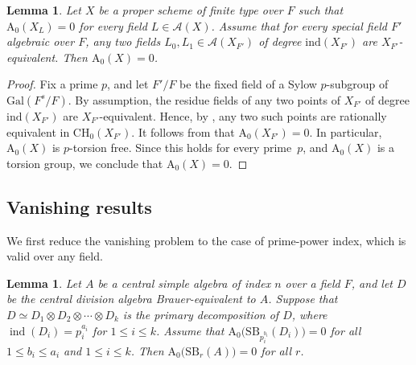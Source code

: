 \documentclass[10pt]{amsart}
\theoremstyle{plain}
\newtheorem{lemma}[thm]{Lemma}
\theoremstyle{definition}
\begin{document}
\begin{lemma}\label{main lemma for triviality} 
Let \(X\) be a proper scheme of finite type over \(F\) such that \(\mathrm{A_0}(X_L)=0\) for every field \(L \in \mathcal{A}(X)\). Assume that for every special field \(F'\) algebraic over \(F\), any two fields \(L_0,L_1 \in \mathcal{A}(X_{F'})\) of degree \(\mathrm{ind}(X_{F'})\) are \(X_{F'}\)-equivalent. Then \(\mathrm{A_0}(X)=0\).
\end{lemma}
\begin{proof} 
Fix a prime \(p\), and let \(F'/F\) be the fixed field of a Sylow \(p\)-subgroup of \(\mathrm{Gal}(F^s/F)\). By assumption, the residue fields of any two points of \(X_{F'}\) of degree \(\mathrm{ind}(X_{F'})\) are \(X_{F'}\)-equivalent. Hence, by \cite[Lemma~6.4]{MC}, any two such points are rationally equivalent in \(\mathrm{CH_0}(X_{F'})\). It follows from \cite[Lemma~5.2]{MC} that \(\mathrm{A_0}(X_{F'})=0\). In particular, \(\mathrm{A_0}(X)\) is \(p\)-torsion free. Since this holds for every prime~\(p\), and \(\mathrm{A_0}(X)\) is a torsion group, we conclude that \(\mathrm{A_0}(X)=0\).
\end{proof}


\subsection{Vanishing results}
We first reduce the vanishing problem to the case of prime-power index, which is valid over any field.
\begin{lemma}\label{reduction to index p CDA}
Let \(A\) be a central simple algebra of index \(n\) over a field \(F\), and let \(D\) be the central division algebra Brauer-equivalent to \(A\). Suppose that \(D \simeq D_1 \otimes D_2 \otimes \cdots \otimes D_k\) is the primary decomposition of \(D\), where \(\operatorname{ind}(D_i)=p_i^{a_i}\) for \(1 \le i \le k\). Assume that \(\mathrm{A_0}\big(\mathrm{SB}_{p_i^{b_i}}(D_i)\big)=0\) for all \(1 \le b_i \le a_i\) and \(1 \le i \le k\). Then \(\mathrm{A_0}\big(\mathrm{SB}_r(A)\big)=0\) for all \(r\).
\end{lemma}
\end{document}
